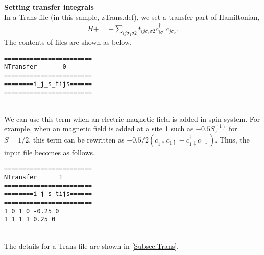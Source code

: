 \begin{description}
\item {\bf Setting transfer integrals}\\
In a Trans file (in this sample, zTrans.def), we set a transfer part of Hamiltonian,
\begin{align}
H +=-\sum_{ij\sigma_1\sigma2} t_{ij\sigma_1\sigma2}c_{i\sigma_1}^{\dag}c_{j\sigma_2}.
\end{align}
The contents of files are shown as below.\\
\begin{minipage}{15cm}
\begin{screen}
\begin{verbatim}
======================== 
NTransfer       0  
======================== 
========i_j_s_tijs====== 
======================== 
\end{verbatim}
\end{screen}
\end{minipage}
~\\
We can use this term when an electric magnetic field is added in spin system. For example, when an magnetic field is added at a site 1 such as $-0.5 S_z^{(1)}$ { for $S=1/2$}, this term can be rewritten as $-0.5/2(c_{1\uparrow}^{\dag}c_{1\uparrow}-c_{1\downarrow}^{\dag}c_{1\downarrow})$. Thus, the input file becomes as follows.\\
\begin{minipage}{15cm}
\begin{screen}
\begin{verbatim}
======================== 
NTransfer      1   
======================== 
========i_j_s_tijs====== 
======================== 
1 0 1 0 -0.25 0
1 1 1 1 0.25 0
\end{verbatim}
\end{screen}
\end{minipage}
~\\
The details for a Trans file are shown in \ref{Subsec:Trans}.


\end{description}

